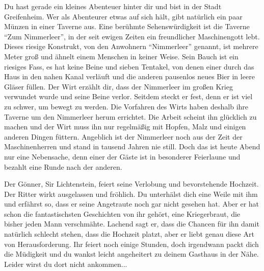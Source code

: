 Du hast gerade ein kleines Abenteuer hinter dir und bist in der Stadt Greifenheim. Wer als Abenteurer etwas auf sich hält, gibt natürlich ein paar Münzen in einer Taverne aus. Eine berühmte Sehenswürdigkeit ist die Taverne ``Zum Nimmerleer'', in der seit ewigen Zeiten ein freundlicher Maschinengott lebt. Dieses riesige Konstrukt, von den Anwohnern ``Nimmerleer'' genannt, ist mehrere Meter groß und ähnelt einem Menschen in keiner Weise. Sein Bauch ist ein riesiges Fass, es hat keine Beine und sieben Tentakel, von denen einer durch das Haus in den nahen Kanal verläuft und die anderen pausenlos neues Bier in leere Gläser füllen.
Der Wirt erzählt dir, dass der Nimmerleer im großen Krieg verwundet wurde und seine Beine verlor. Seitdem steckt er fest, denn er ist viel zu schwer, um bewegt zu werden. Die Vorfahren des Wirts haben deshalb ihre Taverne um den Nimmerleer herum errichtet. Die Arbeit scheint ihn glücklich zu machen und der Wirt muss ihn nur regelmäßig mit Hopfen, Malz und einigen anderen Dingen füttern. Angeblich ist der Nimmerleer noch aus der Zeit der Maschinenherren und stand in tausend Jahren nie still. Doch das ist heute Abend nur eine Nebensache, denn einer der Gäste ist in besonderer Feierlaune und bezahlt eine Runde nach der anderen.

Der Gönner, Sir Lichtenstein, feiert seine Verlobung und bevorstehende Hochzeit. Der Ritter wirkt ausgelassen und fröhlich. Du unterhälst dich eine Weile mit ihm und erfährst so, dass er seine Angetraute noch gar nicht gesehen hat. Aber er hat schon die fantastischsten Geschichten von ihr gehört, eine Kriegerbraut, die bisher jeden Mann verschmähte. Lachend sagt er, dass die Chancen für ihn damit natürlich schlecht stehen, dass die Hochzeit platzt, aber er liebt genau diese Art von Herausforderung. Ihr feiert noch einige Stunden, doch irgendwann packt dich die Müdigkeit und du wankst leicht angeheitert zu deinem Gasthaus in der Nähe. Leider wirst du dort nicht ankommen...
